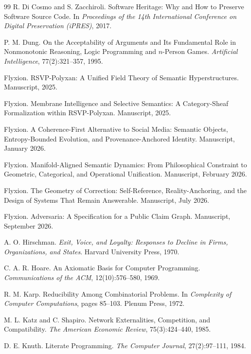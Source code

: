 \documentclass[11pt,twoside,openright]{book}
\theoremstyle{plain}
\theoremstyle{definition}
\theoremstyle{remark}
\begin{document}
\begin{thebibliography}{99}
 R. Di Cosmo and S. Zacchiroli. Software Heritage: Why and How to Preserve Software Source Code. In \emph{Proceedings of the 14th International Conference on Digital Preservation (iPRES)}, 2017.

 P. M. Dung. On the Acceptability of Arguments and Its Fundamental Role in Nonmonotonic Reasoning, Logic Programming and $n$-Person Games. \emph{Artificial Intelligence}, 77(2):321--357, 1995.

 Flyxion. RSVP-Polyxan: A Unified Field Theory of Semantic Hyperstructures. Manuscript, 2025.

 Flyxion. Membrane Intelligence and Selective Semantics: A Category-Sheaf Formalization within RSVP-Polyxan. Manuscript, 2025.

 Flyxion. A Coherence-First Alternative to Social Media: Semantic Objects, Entropy-Bounded Evolution, and Provenance-Anchored Identity. Manuscript, January 2026.

 Flyxion. Manifold-Aligned Semantic Dynamics: From Philosophical Constraint to Geometric, Categorical, and Operational Unification. Manuscript, February 2026.

 Flyxion. The Geometry of Correction: Self-Reference, Reality-Anchoring, and the Design of Systems That Remain Answerable. Manuscript, July 2026.

 Flyxion. Adversaria: A Specification for a Public Claim Graph. Manuscript, September 2026.

 A. O. Hirschman. \emph{Exit, Voice, and Loyalty: Responses to Decline in Firms, Organizations, and States}. Harvard University Press, 1970.

 C. A. R. Hoare. An Axiomatic Basis for Computer Programming. \emph{Communications of the ACM}, 12(10):576--580, 1969.

 R. M. Karp. Reducibility Among Combinatorial Problems. In \emph{Complexity of Computer Computations}, pages 85--103. Plenum Press, 1972.

 M. L. Katz and C. Shapiro. Network Externalities, Competition, and Compatibility. \emph{The American Economic Review}, 75(3):424--440, 1985.

 D. E. Knuth. Literate Programming. \emph{The Computer Journal}, 27(2):97--111, 1984.


\end{thebibliography}
\end{document}
